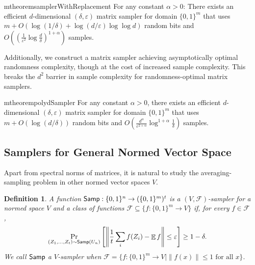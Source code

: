 \documentclass[10pt,a4paper]{article}
\newtheorem{definition}[theorem]{Definition}
\newcommand{\C}{\mathbb{C}}
\DeclareMathOperator*{\E}{\mathbb{E}}
\newcommand{\eps}{\varepsilon}
\newcommand{\1}{\mathbbm{1}}
\newcommand{\norm}[1]{\left\lVert #1\right\rVert}
\newcommand{\zo}{\{0, 1\}}
\newcommand{\Smp}{\textup{\textsf{Samp}}}
\begin{document}
\begin{restatable}{mtheorem}{samplerWithReplacement}
 \label{thm:sampler_with_replacement}
    For any constant $\alpha > 0$:
    There exists an efficient $d$-dimensional $(\delta, \eps)$ matrix sampler for domain $\zo^m$ that uses $m + O(\log(1 / \delta) + \log(d / \eps) \log\log d)$ random bits and $O((\frac{1}{\eps^2}\log\frac{d}{\delta})^{1 + \alpha})$ samples.   
\end{restatable}

Additionally, we construct a matrix sampler achieving asymptotically optimal randomness complexity, though at the cost of increased sample complexity. This breaks the $d^2$ barrier in sample complexity for randomness-optimal matrix samplers.

\begin{restatable}{mtheorem}{polydSampler}
    \label{thm:polydSampler}
        For any constant $\alpha > 0$,  there exists an efficient $d$-dimensional $(\delta, \eps)$ matrix sampler for domain $\zo^m$ that uses $m + O(\log (d / \delta))$ random bits and $O(\frac{d^\alpha}{\eps^{2+\alpha}}\log^{1+\alpha}\frac{1}{\delta})$ samples.
\end{restatable}

\subsection{Samplers for General Normed Vector Space}
Apart from spectral norms of matrices, it is natural to study the averaging-sampling problem in other normed vector spaces \(V\).


\begin{definition}
    A function \(\Smp : \zo^n \to (\zo^m)^t\) is a \((V,\mathcal{F})\)-sampler for a normed space \(V\) and a class of functions \(\mathcal{F} \subseteq \{f:\zo^m \to V\}\) if, for every \(f \in \mathcal{F}\),
    \[
    \Pr_{(Z_1, \dots, Z_t) \sim \Smp(U_n)}
    \left[ \norm{\frac{1}{t}  \sum_i f(Z_i) - \E f} \leq \varepsilon \right]
    \geq 1 - \delta.
    \]
    We call \(\Smp\) a \(V\)-sampler when \(\mathcal{F} = \{f:\zo^m \to V \mid \|f(x)\|\le 1 \text{ for all } x\}\).
\end{definition}

\end{document}
